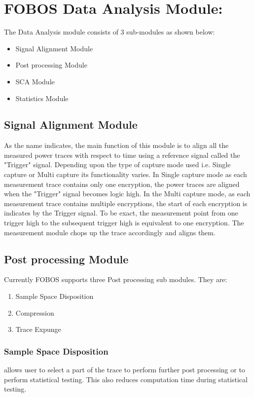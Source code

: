 \documentclass{llncs}
\numberwithin{algorithm}{chapter}
\begin{document}
\section{FOBOS Data Analysis Module:}
The Data Analysis module consists of 3 sub-modules as shown below:
\begin{itemize}
\item Signal Alignment Module
\item Post processing Module
\item SCA Module
\item Statistics Module
\end{itemize}

\subsection{Signal Alignment Module}
As the name indicates, the main function of this module is to align all the measured power traces
with respect to time using a reference signal called the "Trigger" signal. Depending upon the type
of capture mode used i.e. Single capture or Multi capture its functionality varies. In Single capture
mode as each measurement trace contains only one encryption, the power traces are aligned when the 
"Trigger" signal becomes logic high. In the Multi capture mode, as each measurement trace contains 
multiple encryptions, the start of each encryption is indicates by the Trigger signal.
To be exact, the measurement point from one trigger high to the subsequent trigger high is equivalent
to one encryption. The measurement module chops up the trace accordingly and aligns them.

\subsection{Post processing Module}
Currently FOBOS supports three Post processing sub modules. They are:
\begin{enumerate}
\item Sample Space Disposition
\item Compression
\item Trace Expunge
\end{enumerate}

\subsubsection{Sample Space Disposition} allows user to select a part of the trace to perform further post processing
or to perform statistical testing. This also reduces computation time during statistical testing.
\end{document}
